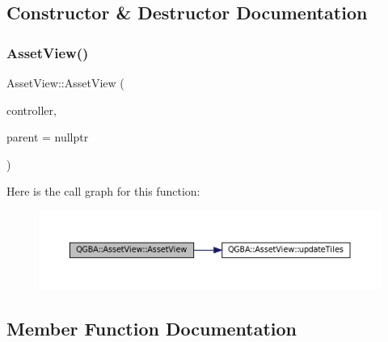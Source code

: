 \subsection{Constructor \& Destructor Documentation}
\mbox{\label{class_q_g_b_a_1_1_asset_view_a106d5c6432f8745e8d331760704e3619}} 
\subsubsection{\texorpdfstring{Asset\+View()}{AssetView()}}
{\footnotesize\ttfamily Asset\+View\+::\+Asset\+View (\begin{DoxyParamCaption}\item[{std\+::shared\+\_\+ptr$<$ \mbox{\hyperlink{class_q_g_b_a_1_1_core_controller}{Core\+Controller}} $>$}]{controller,  }\item[{Q\+Widget $\ast$}]{parent = {\ttfamily nullptr} }\end{DoxyParamCaption})}

Here is the call graph for this function\+:
\nopagebreak
\begin{figure}[H]
\begin{center}
\leavevmode
\includegraphics[width=350pt]{class_q_g_b_a_1_1_asset_view_a106d5c6432f8745e8d331760704e3619_cgraph}
\end{center}
\end{figure}


\subsection{Member Function Documentation}
\mbox{\label{class_q_g_b_a_1_1_asset_view_aea61abdd1cef7db1227c8ebfc1c29f58}} 
